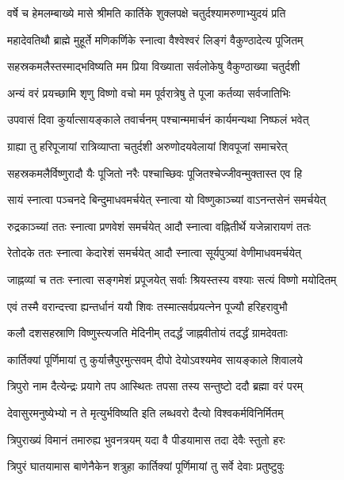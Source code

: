 \twolineshloka
{वर्षे च हेमलम्बाख्ये मासे श्रीमति कार्तिके}
{शुक्लपक्षे चतुर्दश्यामरुणाभ्युदयं प्रति} %

\twolineshloka
{महादेवतिथौ ब्राह्मे मुहूर्ते मणिकर्णिके}
{स्नात्वा वैश्वेश्वरं लिङ्गं वैकुण्ठादेत्य पूजितम्} %

\twolineshloka
{सहस्रकमलैस्तस्माद्भविष्यति मम प्रिया}
{विख्याता सर्वलोकेषु वैकुण्ठाख्या चतुर्दशी} %

\twolineshloka
{अन्यं वरं प्रयच्छामि शृणु विष्णो वचो मम}
{पूर्वरात्रेषु ते पूजा कर्तव्या सर्वजातिभिः} %

\twolineshloka
{उपवासं दिवा कुर्यात्सायङ्काले तवार्चनम्}
{पश्चान्ममार्चनं कार्यमन्यथा निष्फलं भवेत्} %

\twolineshloka
{ग्राह्या तु हरिपूजायां रात्रिव्याप्ता चतुर्दशी}
{अरुणोदयवेलायां शिवपूजां समाचरेत्} %

\twolineshloka
{सहस्रकमलैर्विष्णुरादौ यैः पूजितो नरैः}
{पश्चाच्छिवः पूजितश्चेज्जीवन्मुक्तास्त एव हि} %

\twolineshloka
{सायं स्नात्वा पञ्चनदे बिन्दुमाधवमर्चयेत्}
{स्नात्वा यो विष्णुकाञ्च्यां वाऽनन्तसेनं समर्चयेत्} %

\twolineshloka
{रुद्रकाञ्च्यां ततः स्नात्वा प्रणवेशं समर्चयेत्}
{आदौ स्नात्वा वह्नितीर्थे यजेन्नारायणं ततः} %

\twolineshloka
{रेतोदके ततः स्नात्वा केदारेशं समर्चयेत्}
{आदौ स्नात्वा सूर्यपुत्र्यां वेणीमाधवमर्चयेत्} %

\twolineshloka
{जाह्नव्यां च ततः स्नात्वा सङ्गमेशं प्रपूजयेत्}
{सर्वाः श्रियस्तस्य वश्याः सत्यं विष्णो मयोदितम्} %

\twolineshloka
{एवं तस्मै वरान्दत्त्वा ह्यन्तर्धानं ययौ शिवः}
{तस्मात्सर्वप्रयत्नेन पूज्यौ हरिहरावुभौ} %

\twolineshloka
{कलौ दशसहस्राणि विष्णुस्त्यजति मेदिनीम्}
{तदर्द्धं जाह्नवीतोयं तदर्द्धं ग्रामदेवताः} %

\twolineshloka
{कार्तिक्यां पूर्णिमायां तु कुर्यात्त्रैपुरमुत्सवम्}
{दीपो देयोऽवश्यमेव सायङ्काले शिवालये} %

\twolineshloka
{त्रिपुरो नाम दैत्येन्द्रः प्रयागे तप आस्थितः}
{तपसा तस्य सन्तुष्टो ददौ ब्रह्मा वरं परम्} %

\twolineshloka
{देवासुरमनुष्येभ्यो न ते मृत्युर्भविष्यति}
{इति लब्धवरो दैत्यो विश्वकर्मविनिर्मितम्} %

\twolineshloka
{त्रिपुराख्यं विमानं तमारुह्य भुवनत्रयम्}
{यदा वै पीडयामास तदा देवैः स्तुतो हरः} %

\twolineshloka
{त्रिपुरं घातयामास बाणेनैकेन शत्रुहा}
{कार्तिक्यां पूर्णिमायां तु सर्वे देवाः प्रतुष्टुवुः} %

